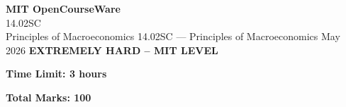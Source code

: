 \documentclass[12pt,a4paper]{exam}
\begin{document}
\begin{center}
{\LARGE \textbf{MIT OpenCourseWare}}\\14.02SC\\Principles of Macroeconomics
\vspace{0.5cm}
{14.02SC} --- {Principles of Macroeconomics}
\vspace{0.3cm}
May 2026
\vspace{0.3cm}
\textbf{EXTREMELY HARD -- MIT LEVEL}
\end{center}

\begin{center}
\textbf{Time Limit: 3 hours}
\end{center}

\begin{center}
\textbf{Total Marks: 100}
\end{center}

\vspace{0.5cm}
\end{document}
